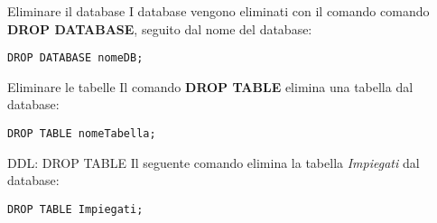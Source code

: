 %
\begin{frame}[fragile]{Eliminare il database}
I database vengono eliminati con il comando comando \textbf{DROP DATABASE}, seguito dal nome del database:
\begin{lstlisting}
DROP DATABASE nomeDB;
\end{lstlisting}
\end{frame}
%
\begin{frame}[fragile]{Eliminare le tabelle}
Il comando \textbf{DROP TABLE} elimina una tabella dal database:
\begin{lstlisting}
DROP TABLE nomeTabella;
\end{lstlisting}
\end{frame}
%
\begin{frame}[fragile]{DDL: DROP TABLE}
Il seguente comando elimina la tabella \textit{Impiegati} dal database:
\begin{lstlisting}
DROP TABLE Impiegati;
\end{lstlisting}
\end{frame}
%